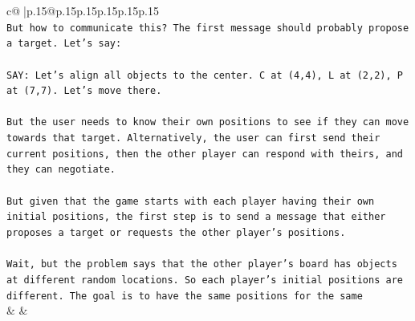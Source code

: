 \documentclass{article}
\begin{document}
{\begin{supertabular}{c@{$\;$}|p{.15\linewidth}@{}p{.15\linewidth}p{.15\linewidth}p{.15\linewidth}p{.15\linewidth}p{.15\linewidth}}
{{{\\ 
\texttt{But how to communicate this? The first message should probably propose a target. Let's say:} \\
\\ 
\texttt{SAY: Let's align all objects to the center. C at (4,4), L at (2,2), P at (7,7). Let's move there.} \\
\\ 
\texttt{But the user needs to know their own positions to see if they can move towards that target. Alternatively, the user can first send their current positions, then the other player can respond with theirs, and they can negotiate.} \\
\\ 
\texttt{But given that the game starts with each player having their own initial positions, the first step is to send a message that either proposes a target or requests the other player's positions.} \\
\\ 
\texttt{Wait, but the problem says that the other player's board has objects at different random locations. So each player's initial positions are different. The goal is to have the same positions for the same} \\
            }
        }
    }
    & & \\ \\


\end{supertabular}}
\end{document}
